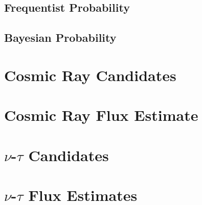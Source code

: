 	\subsection{Frequentist Probability}
		
	
		
		
	\subsection{Bayesian Probability}


\section{Cosmic Ray Candidates}

\section{Cosmic Ray Flux Estimate}


\section{$\nu$-$\tau$ Candidates}

\section{$\nu$-$\tau$ Flux Estimates}